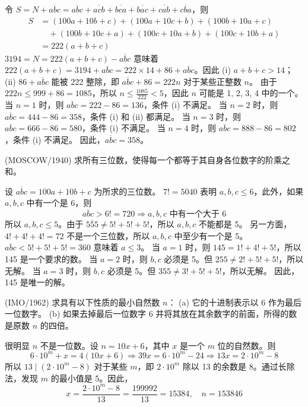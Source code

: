 \begin{questions}
\begin{solution}
令 $S = N + \overline{abc} = \overline{abc} + \overline{acb} + \overline{bca} + \overline{bac} + \overline{cab} + \overline{cba}$，则
\begin{align*}
S &= (100a + 10b + c) + (100a + 10c + b) + (100b + 10a + c) \\
&\quad + (100b + 10c + a) + (100c + 10a + b) + (100c + 10b + a) \\
&= 222(a + b + c)
\end{align*}
$3194 = N = 222(a + b + c) - \overline{abc}$ 意味着 $222(a + b + c) = 3194 + \overline{abc} = 222 \times 14 + 86 + \overline{abc}$。因此
(i) $a + b + c > 14$；
(ii) $86 + \overline{abc}$ 能被 222 整除，即 $\overline{abc} + 86 = 222n$ 对于某些正整数 $n$。
由于 $222n \leq 999 + 86 = 1085$，所以 $n \leq \frac{1085}{222} < 5$，因此 $n$ 可能是 1, 2, 3, 4 中的一个。
当 $n = 1$ 时，则 $\overline{abc} = 222 - 86 = 136$，条件 (i) 不满足。
当 $n = 2$ 时，则 $\overline{abc} = 444 - 86 = 358$，条件 (i) 和 (ii) 都满足。
当 $n = 3$ 时，则 $\overline{abc} = 666 - 86 = 580$，条件 (i) 不满足。
当 $n = 4$ 时，则 $\overline{abc} = 888 - 86 = 802$，条件 (i) 不满足。
因此，$\overline{abc} = 358$。
\end{solution}

\question (MOSCOW/1940) 求所有三位数，使得每一个都等于其自身各位数字的阶乘之和。

\begin{solution}
设 $\overline{abc} = 100a + 10b + c$ 为所求的三位数。
$7! = 5040$ 表明 $a, b, c \leq 6$，此外，如果 $a, b, c$ 中有一个是 6，则
\[
\overline{abc} > 6! = 720 \Rightarrow a, b, c \text{ 中有一个大于 6}
\]
所以 $a, b, c \leq 5$。由于 $\overline{555} \neq 5! + 5! + 5!$，所以 $a, b, c$ 不能都是 5。
另一方面，$4! + 4! + 4! = 72$ 不是一个三位数，所以 $a, b, c$ 中至少有一个是 5。$\overline{abc} < 5! + 5! + 5! = 360$ 意味着 $a \leq 3$。
当 $a = 1$ 时，则 $145 = 1! + 4! + 5!$，所以 145 是一个要求的数。
当 $a = 2$ 时，则 $b, c$ 必须是 5。但 $255 \neq 2! + 5! + 5!$，所以无解。
当 $a = 3$ 时，则 $b, c$ 必须是 5。但 $355 \neq 3! + 5! + 5!$，所以无解。
因此，145 是唯一的解。
\end{solution}

\question (IMO/1962) 求具有以下性质的最小自然数 $n$：
(a) 它的十进制表示以 6 作为最后一位数字。
(b) 如果去掉最后一位数字 6 并将其放在其余数字的前面，所得的数是原数 $n$ 的四倍。

\begin{solution}
很明显 $n$ 不是一位数。设 $n = 10x + 6$，其中 $x$ 是一个 $m$ 位的自然数。则
\[
6 \cdot 10^m + x = 4(10x + 6) \Rightarrow 39x = 6 \cdot 10^m - 24 \Rightarrow 13x = 2 \cdot 10^m - 8
\]
所以 $13 \mid (2 \cdot 10^m - 8)$ 对于某些 $m$，即 $2 \cdot 10^m$ 除以 13 的余数是 8。通过长除法，发现 $m$ 的最小值是 5。因此，
\[
x = \frac{2 \cdot 10^m - 8}{13} = \frac{199992}{13} = 15384, \quad n = 153846
\]
\end{solution}


\end{questions}

